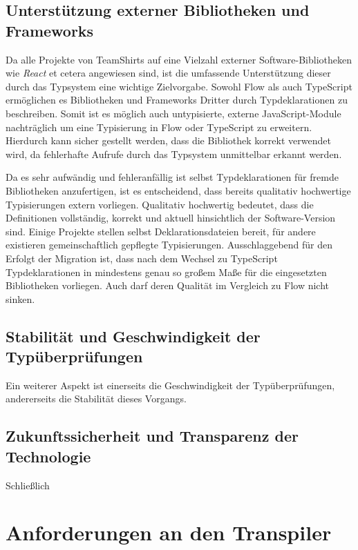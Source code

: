 \subsection{Unterstützung externer Bibliotheken und Frameworks}

Da alle Projekte von TeamShirts auf eine Vielzahl externer Software-Bibliotheken wie \textit{React} et cetera angewiesen sind, ist die umfassende Unterstützung dieser durch das Typsystem eine wichtige Zielvorgabe. Sowohl Flow als auch TypeScript ermöglichen es Bibliotheken und Frameworks Dritter durch Typdeklarationen zu beschreiben. Somit ist es möglich auch untypisierte, externe JavaScript-Module nachträglich um eine Typisierung in Flow oder TypeScript zu erweitern. Hierdurch kann sicher gestellt werden, dass die Bibliothek korrekt verwendet wird, da fehlerhafte Aufrufe durch das Typsystem unmittelbar erkannt werden.

Da es sehr aufwändig und fehleranfällig ist selbst Typdeklarationen für fremde Bibliotheken anzufertigen, ist es entscheidend, dass bereits qualitativ hochwertige Typisierungen extern vorliegen. Qualitativ hochwertig bedeutet, dass die Definitionen vollständig, korrekt und aktuell hinsichtlich der Software-Version sind. Einige Projekte stellen selbst Deklarationsdateien bereit, für andere existieren gemeinschaftlich gepflegte Typisierungen. Ausschlaggebend für den Erfolgt der Migration ist, dass nach dem Wechsel zu TypeScript Typdeklarationen in mindestens genau so großem Maße für die eingesetzten Bibliotheken vorliegen. Auch darf deren Qualität im Vergleich zu Flow nicht sinken.

\subsection{Stabilität und Geschwindigkeit der Typüberprüfungen}

Ein weiterer Aspekt ist einerseits die Geschwindigkeit der Typüberprüfungen, andererseits die Stabilität dieses Vorgangs.

\subsection{Zukunftssicherheit und Transparenz der Technologie}

Schließlich

\section{Anforderungen an den Transpiler}

